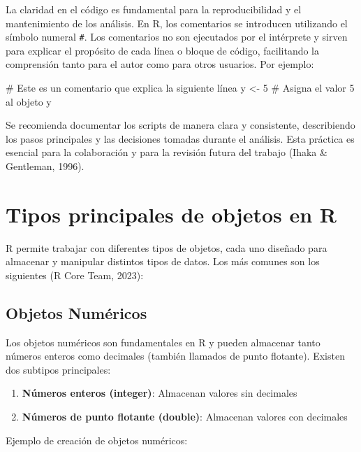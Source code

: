 \documentclass[
  spanish,
  a4paper,
  DIV=11,
  numbers=noendperiod,
  onepage,
  openany]{scrreprt}
\newenvironment{Shaded}{\begin{snugshade}}{\end{snugshade}}
\newcommand{\CommentTok}[1]{\textcolor[rgb]{0.37,0.37,0.37}{#1}}
\newcommand{\DecValTok}[1]{\textcolor[rgb]{0.68,0.00,0.00}{#1}}
\newcommand{\NormalTok}[1]{\textcolor[rgb]{0.00,0.23,0.31}{#1}}
\newcommand{\OtherTok}[1]{\textcolor[rgb]{0.00,0.23,0.31}{#1}}
\begin{document}
La claridad en el código es fundamental para la reproducibilidad y el
mantenimiento de los análisis. En R, los comentarios se introducen
utilizando el símbolo numeral \texttt{\#}. Los comentarios no son
ejecutados por el intérprete y sirven para explicar el propósito de cada
línea o bloque de código, facilitando la comprensión tanto para el autor
como para otros usuarios. Por ejemplo:

\begin{Shaded}
\begin{Highlighting}[]
\CommentTok{\# Este es un comentario que explica la siguiente línea}
\NormalTok{y }\OtherTok{\textless{}{-}} \DecValTok{5}  \CommentTok{\# Asigna el valor 5 al objeto y}
\end{Highlighting}
\end{Shaded}

Se recomienda documentar los scripts de manera clara y consistente,
describiendo los pasos principales y las decisiones tomadas durante el
análisis. Esta práctica es esencial para la colaboración y para la
revisión futura del trabajo (Ihaka \& Gentleman, 1996).

\section{Tipos principales de objetos en
R}\label{tipos-principales-de-objetos-en-r}

R permite trabajar con diferentes tipos de objetos, cada uno diseñado
para almacenar y manipular distintos tipos de datos. Los más comunes son
los siguientes (R Core Team, 2023):

\subsection{Objetos Numéricos}\label{objetos-numuxe9ricos}

Los objetos numéricos son fundamentales en R y pueden almacenar tanto
números enteros como decimales (también llamados de punto flotante).
Existen dos subtipos principales:

\begin{enumerate}
\def\labelenumi{\arabic{enumi}.}
\item
  \textbf{Números enteros (integer)}: Almacenan valores sin decimales
\item
  \textbf{Números de punto flotante (double)}: Almacenan valores con
  decimales
\end{enumerate}

Ejemplo de creación de objetos numéricos:
\end{document}

